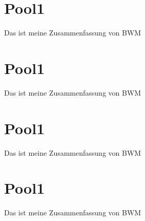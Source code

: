 \documentclass[letterpaper,10pt,english]{sphinxmanual}
\begin{document}
\chapter{Pool1}
\label{\detokenize{pool3:pool1}}\label{\detokenize{pool3::doc}}
Das ist meine Zusammenfassung von BWM


\chapter{Pool1}
\label{\detokenize{pool4:pool1}}\label{\detokenize{pool4::doc}}
Das ist meine Zusammenfassung von BWM


\chapter{Pool1}
\label{\detokenize{pool5:pool1}}\label{\detokenize{pool5::doc}}
Das ist meine Zusammenfassung von BWM


\chapter{Pool1}
\label{\detokenize{pool6:pool1}}\label{\detokenize{pool6::doc}}
Das ist meine Zusammenfassung von BWM



\renewcommand{\indexname}{Index}
\printindex
\end{document}
